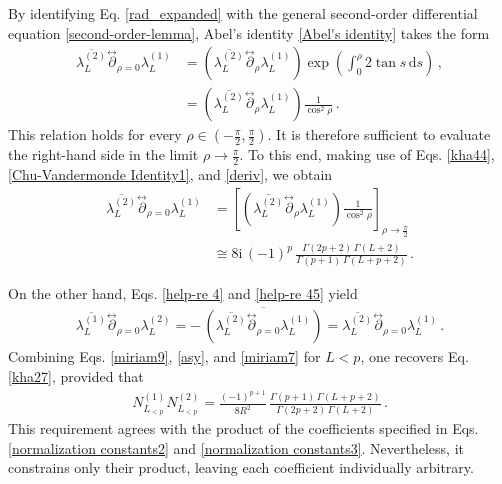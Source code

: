 \documentclass[aps,twocolumn,nofootinbib]{revtex4}
\begin{document}
{\begin{appendix}
By identifying Eq. \eqref{rad_expanded} with the general second-order differential equation \eqref{second-order-lemma}, Abel's identity \eqref{Abel's identity} takes the form
\begin{align}\label{Va-Az}
    \overline{\lambda_{L}^{(2)}} \stackrel{\leftrightarrow}{\partial}_{\rho=0}\lambda_{L}^{(1)} &= \left( \overline{\lambda_{L}^{(2)}}\stackrel{\leftrightarrow}{\partial}_{\rho}\lambda_{L}^{(1)} \right)\exp\left(\int_{0}^{\rho} 2\tan s\,{\mathrm{d}}s \right)\,,\nonumber\\[3pt]
    & = \left( \overline{\lambda_{L}^{(2)}}\stackrel{\leftrightarrow}{\partial}_{\rho}\lambda_{L}^{(1)} \right) \frac{1}{\cos^2\rho} \,.
\end{align}
This relation holds for every $\rho\in\left(-\tfrac{\pi}{2},\tfrac{\pi}{2}\right)$. It is therefore sufficient to evaluate the right-hand side in the limit $\rho\longrightarrow\tfrac{\pi}{2}$. To this end, making use of Eqs. \eqref{kha44}, \eqref{Chu-Vandermonde Identity1}, and \eqref{deriv}, we obtain
\begin{align}\label{asy}
    \overline{\lambda_{L}^{(2)}} \stackrel{\leftrightarrow}{\partial}_{\rho=0}\lambda_{L}^{(1)} &= \left[ \left( \overline{\lambda_{L}^{(2)}}\stackrel{\leftrightarrow}{\partial}_{\rho}\lambda_{L}^{(1)} \right) \frac{1}{\cos^2\rho} \right]_{\rho\longrightarrow \tfrac{\pi}{2}} \nonumber\\[3pt]
    &\cong 8\mathrm{i}\,(-1)^p \, \frac{\Gamma(2p+2)\, \Gamma(L+2)}{\Gamma(p+1)\, \Gamma(L+p+2)} \,.
\end{align}

On the other hand, Eqs. \eqref{help-re 4} and \eqref{help-re 45} yield
\begin{align}\label{miriam7}
    \overline{\lambda_{L}^{(1)}} \stackrel{\leftrightarrow}{\partial}_{\rho=0} \lambda_{L}^{(2)} = -\,\overline{\left(\overline{\lambda_{L}^{(2)}} \stackrel{\leftrightarrow}{\partial}_{\rho=0}\lambda_{L}^{(1)}\right)} = \overline{\lambda_{L}^{(2)}} \stackrel{\leftrightarrow}{\partial}_{\rho=0}\lambda_{L}^{(1)} \,.
\end{align}
Combining Eqs. \eqref{miriam9}, \eqref{asy}, and \eqref{miriam7} for $L<p$, one recovers Eq. \eqref{kha27}, provided that
\begin{align}\label{miriam10}
    N^{(1)}_{L^{}_{< p}} N^{(2)}_{L^{}_{< p}} = \frac{(-1)^{p+1}}{8 R^2}\, \frac{\Gamma(p+1) \,\Gamma(L+p+2)}{\Gamma(2p+2) \, \Gamma(L+2)} \,.
\end{align}
This requirement agrees with the product of the coefficients specified in Eqs. \eqref{normalization constants2} and \eqref{normalization constants3}. Nevertheless, it constrains only their product, leaving each coefficient individually arbitrary.


\end{appendix}}
\end{document}
